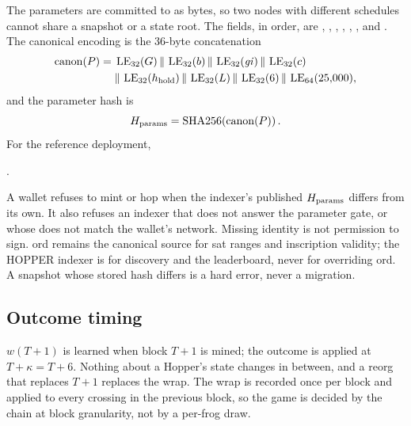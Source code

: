 The parameters are committed to as bytes, so two nodes with different
schedules cannot share a snapshot or a state root. The fields, in order, are
, , , ,
, ,  and
. The canonical encoding is the 36-byte concatenation
\begin{equation}\label{eq:canon}
\begin{aligned}
\operatorname{canon}(P)={}&
\operatorname{LE}_{32}(G)\,\|\,\operatorname{LE}_{32}(b)\,\|\,\operatorname{LE}_{32}(\mathit{gi})\,\|\,
\operatorname{LE}_{32}(c)\\
&{}\|\,\operatorname{LE}_{32}(h_{\rm hold})\,\|\,\operatorname{LE}_{32}(L)\,\|\,
\operatorname{LE}_{32}(6)\,\|\,\operatorname{LE}_{64}(25{,}000),
\end{aligned}
\end{equation}
and the parameter hash is
\begin{equation}\label{eq:paramhash}
H_{\rm params}=\operatorname{SHA256}\!\left(\operatorname{canon}(P)\right).
\end{equation}
For the reference deployment,
\begin{center}
.
\end{center}
A wallet refuses to mint or hop when the indexer's published $H_{\rm params}$
differs from its own. It also refuses an indexer that does not answer the
parameter gate, or whose  does not match the wallet's network.
Missing identity is not permission to sign. ord remains the canonical source
for sat ranges and inscription validity; the HOPPER indexer is for discovery
and the leaderboard, never for overriding ord. A snapshot whose stored hash
differs is a hard error, never a migration.

\subsection{Outcome timing}

$w(T+1)$ is learned when block $T+1$ is mined; the outcome is applied at
$T+\kappa=T+6$. Nothing about a Hopper's state changes in between, and a
reorg that replaces $T+1$ replaces the wrap. The wrap is recorded once per
block and applied to every crossing in the previous block, so the game is
decided by the chain at block granularity, not by a per-frog draw.
